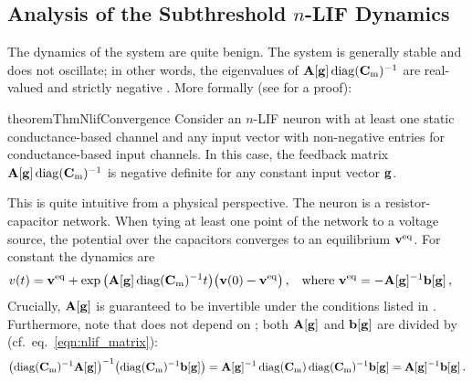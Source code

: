 \pagebreak

\subsection{Analysis of the Subthreshold $n$-LIF Dynamics}
\label{sec:nlif_subth_properties}

The dynamics of the \nlif system are quite benign.
The system is generally stable and does not oscillate; in other words, the eigenvalues of $\mathbf{A}[\mathbf{g}] \operatorname{\mathrm{diag}}({{\mathbf{C}}_\mathrm{m}})^{-1}$ are real-valued and strictly negative \citep[e.g.,][Chapter~5]{strogatz1994nonlinear}.
More formally (see  for a proof):
\begin{restatable}{theorem}{ThmNlifConvergence}
\label{thm:nlif_convergence}
Consider an $n$-LIF neuron with at least one static conductance-based channel and any input vector \vng with non-negative entries for conductance-based input channels.
In this case, the feedback matrix $\mathbf{A}[\mathbf{g}] \operatorname{\mathrm{diag}}({{\mathbf{C}}_\mathrm{m}})^{-1}$ is negative definite for any constant input vector $\mathbf{g}$.
\end{restatable}
This is quite intuitive from a physical perspective.
The \nlif neuron is a resistor-capacitor network.
When tying at least one point of the network to a voltage source, the potential over the capacitors converges to an equilibrium $\mathbf{v}^\mathrm{eq}$.
For constant \vng the dynamics are
\begin{align}
	{{\ensuremath{v}}}(t)
		&= \mathbf{v}^\mathrm{eq} + \exp\big(\mathbf{A}[\mathbf{g}] \operatorname{\mathrm{diag}}({{\mathbf{C}}_\mathrm{m}})^{-1} t\big) \big({\mathbf{v}}(0) - \mathbf{v}^\mathrm{eq}\big) \,,
		& \text{where }  \mathbf{v}^\mathrm{eq} &= -\mathbf{A}[\mathbf{g}]^{-1} \mathbf{b}[\mathbf{g}] \,,
	\label{eqn:nlif_dynamics}
\end{align}
Crucially, $\mathbf{A}[\mathbf{g}]$ is guaranteed to be invertible under the conditions listed in .
Furthermore, note that \vneq does not depend on \vCm; both $\mathbf{A}[\mathbf{g}]$ and $\mathbf{b}[\mathbf{g}]$ are divided by \vCm (cf.~eq.~\ref{eqn:nlif_matrix}):
\begin{align*}
	  \bigl(\operatorname{\mathrm{diag}}({{\mathbf{C}}_\mathrm{m}})^{-1} \mathbf{A}[\mathbf{g}]\bigr)^{-1} \bigl(\operatorname{\mathrm{diag}}({{\mathbf{C}}_\mathrm{m}})^{-1} \mathbf{b}[\mathbf{g}]\bigr)
	= \mathbf{A}[\mathbf{g}]^{-1} \operatorname{\mathrm{diag}}({{\mathbf{C}}_\mathrm{m}}) \operatorname{\mathrm{diag}}({{\mathbf{C}}_\mathrm{m}})^{-1} \mathbf{b}[\mathbf{g}] = \mathbf{A}[\mathbf{g}]^{-1} \mathbf{b}[\mathbf{g}] \,.
\end{align*} 

